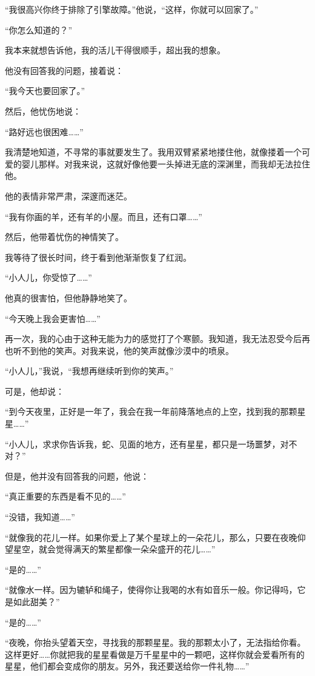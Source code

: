 “我很高兴你终于排除了引擎故障。”他说，“这样，你就可以回家了。”

“你怎么知道的？”

我本来就想告诉他，我的活儿干得很顺手，超出我的想象。

他没有回答我的问题，接着说：

“我今天也要回家了。”

然后，他忧伤地说：

“路好远也很困难\ldots{}\ldots{}”

我清楚地知道，不寻常的事就要发生了。我用双臂紧紧地搂住他，就像搂着一个可爱的婴儿那样。对我来说，这就好像他要一头掉进无底的深渊里，而我却无法拉住他。

他的表情非常严肃，深邃而迷茫。

“我有你画的羊，还有羊的小屋。而且，还有口罩\ldots{}\ldots{}”

然后，他带着忧伤的神情笑了。

我等待了很长时间，终于看到他渐渐恢复了红润。

“小人儿，你受惊了\ldots{}\ldots{}”

他真的很害怕，但他静静地笑了。

“今天晚上我会更害怕\ldots{}\ldots{}”

再一次，我的心由于这种无能为力的感觉打了个寒颤。我知道，我无法忍受今后再也听不到他的笑声。对我来说，他的笑声就像沙漠中的喷泉。

“小人儿，”我说，“我想再继续听到你的笑声。”

可是，他却说：

“到今天夜里，正好是一年了，我会在我一年前降落地点的上空，找到我的那颗星星\ldots{}\ldots{}”

“小人儿，求求你告诉我，蛇、见面的地方，还有星星，都只是一场噩梦，对不对？”

但是，他并没有回答我的问题，他说：

“真正重要的东西是看不见的\ldots{}\ldots{}”

“没错，我知道\ldots{}\ldots{}”

“就像我的花儿一样。如果你爱上了某个星球上的一朵花儿，那么，只要在夜晚仰望星空，就会觉得满天的繁星都像一朵朵盛开的花儿\ldots{}\ldots{}”

“是的\ldots{}\ldots{}”

“就像水一样。因为辘轳和绳子，使得你让我喝的水有如音乐一般。你记得吗，它是如此甜美？”

“是的\ldots{}\ldots{}”

“夜晚，你抬头望着天空，寻找我的那颗星星。我的那颗太小了，无法指给你看。这样更好\ldots{}\ldots{}你就把我的星星看做是万千星星中的一颗吧，这样你就会爱看所有的星星，他们都会变成你的朋友。另外，我还要送给你一件礼物\ldots{}\ldots{}”

